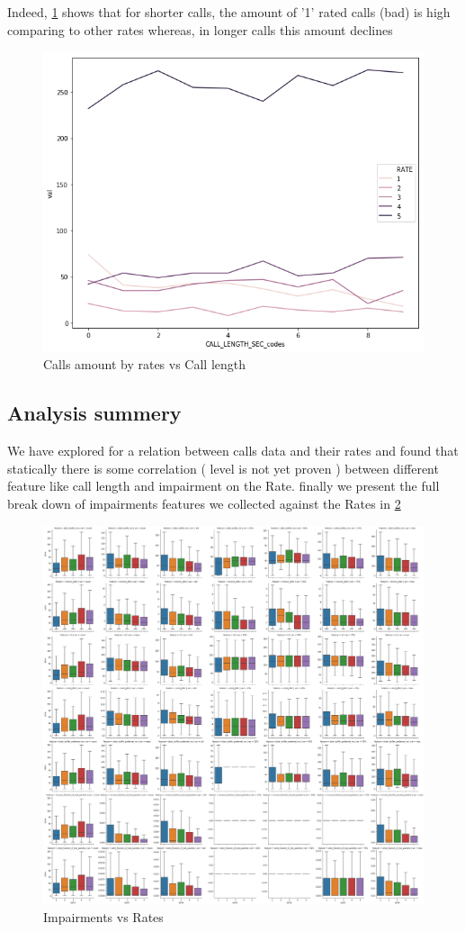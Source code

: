 Indeed, \ref{fig:Rates_call_length} shows that for shorter calls, the amount of '1' rated calls (bad) is high comparing to other rates whereas, in longer calls this amount declines   

\begin{figure}
    \centering
    \includegraphics[scale=0.6]{figures/Rates_call_length_lines.png}
    \caption{Calls amount by rates vs Call length}
    \label{fig:Rates_call_length}
\end{figure}

\subsection{Analysis summery}
We have explored for a relation between calls data and their rates and found that statically there is some correlation ( level is not yet proven ) between different feature like call length and impairment on the Rate.
finally we present the full break down of impairments features we collected against the Rates in \ref{fig:all_arrays}

\begin{figure}
    \centering
    \includegraphics[scale=0.2]{figures/all_arrays.png}
    \caption{Impairments vs Rates}
    \label{fig:all_arrays}
\end{figure}

